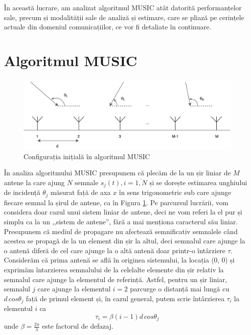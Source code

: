 În această lucrare, am analizat algoritmul MUSIC atât datorită performanțelor sale,
precum și modalității sale de analiză și estimare, care se pliază pe cerințele
actuale din domeniul comunicațiilor, ce vor fi detaliate în continuare.

\section{Algoritmul MUSIC}
\label{sec:theory-music}

\begin{figure}[h]
    \centering
    \includegraphics[width=1\textwidth]{src/img/signals}
    \caption{Configurația inițială în algoritmul MUSIC}
    \label{fig:array-for-doa}
\end{figure}


În analiza algoritmului MUSIC presupunem că plecăm de la un șir liniar de $M$
antene la care ajung $N$ semnale $s_j(t), i = \overline{1, N}$ și se dorește
estimarea unghiului de incidență $\theta_j$ măsurat față de axa $x$ în sens
trigonometric sub care ajunge fiecare semnal la șirul de antene, ca în Figura
\ref{fig:array-for-doa}. Pe parcursul lucrării, vom considera doar cazul unui
sistem liniar de antene, deci ne vom referi la el pur și simplu ca la un
,,sistem de antene'', fără a mai menționa caracterul său liniar. Presupunem că
mediul de propagare nu afectează semnificativ semnalele când acestea se propagă
de la un element din șir la altul, deci semnalul care ajunge la o antenă diferă
de cel care ajunge la o altă antenă doar printr-o întârziere $\tau$. \\

Considerăm că prima antenă se află în originea sistemului, la locația (0, 0) și
exprimăm întarzierea semnalului de la celelalte elemente din șir relativ la
semnalul care ajunge la elementul de referință. Astfel, pentru un șir liniar,
semnalul $j$ care ajunge la elementul $i = 2$ parcurge o distanță mai lungă cu
$d\,cos\theta_j$ față de primul element și, în cazul general, putem scrie
întârzierea $\tau_i$ la elementul $i$ ca
\begin{equation}
    \tau_i = \beta(i-1)d\,cos\theta_j
\end{equation}
unde $\beta = \frac{2\pi}{\lambda}$ este factorul de defazaj. \\

